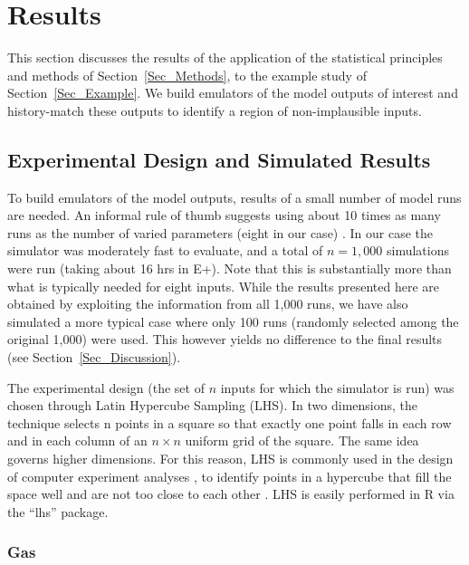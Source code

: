 \documentclass[preprint,12pt, sort&compress]{elsarticle}
\begin{document}

\section{Results}
\label{Sec_Results}
This section discusses the results of the application of the statistical principles and methods of Section~\ref{Sec_Methods}, to the example study of Section~\ref{Sec_Example}. We build emulators of the model outputs of interest and history-match these outputs to identify a region of non-implausible inputs. 


\subsection{Experimental Design and Simulated Results}

To build emulators of the model outputs, results of a small number of model runs are needed. An informal rule of thumb suggests using about 10 times as many runs as the number of varied parameters (eight in our case) \cite{loeppky2009}. In our case the simulator was moderately fast to evaluate, and a total of $n=1,000$ simulations were run (taking about 16 hrs in E+). Note that this is substantially more than what is typically needed for eight inputs. While the results presented here are obtained by exploiting the information from all 1,000 runs, we have also simulated a more typical case where only 100 runs (randomly selected among the original 1,000) were used. This however yields no difference to the final results (see Section~\ref{Sec_Discussion}). 

The experimental design (the set of $n$ inputs for which the simulator is run) was chosen through Latin Hypercube Sampling (LHS). In two dimensions, the technique selects n points in a square so that exactly one point falls in each row and in each column of an $n\times n$ uniform grid of the square.  The same idea governs higher dimensions. For this reason, LHS is commonly used in the design of computer experiment analyses \cite{vernon2010galaxy, lord2017, pope2021}, to identify points in a hypercube that fill the space well and are not too close to each other \cite{mckay2000}. LHS is easily performed in R via the “lhs” package.


\subsubsection{Gas}
\end{document}
